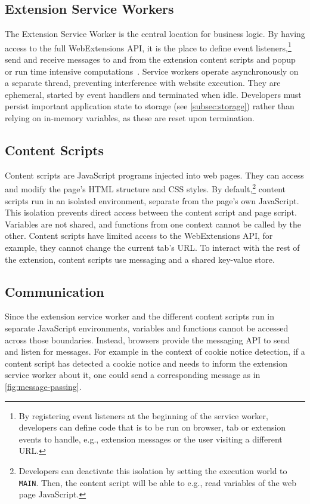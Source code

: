 \subsection{Extension Service Workers} \label{subsec:service-workers}
The Extension Service Worker is the central location for business logic.
By having access to the full WebExtensions API, it is the place to define event listeners,\footnote{
By registering event listeners at the beginning of the service worker, developers can define code that is to be run on browser, tab or extension events to handle, e.g., extension messages or the user visiting a different URL.}
send and receive messages to and from the extension content scripts and popup
or run time intensive computations~\cite[Ch. 4]{frisbie2023browser}.
Service workers operate asynchronously on a separate thread, preventing interference with website execution. 
They are ephemeral, started by event handlers and terminated when idle.
Developers must persist important application state to storage (see \cref{subsec:storage}) rather than relying on in-memory variables, as these are reset upon termination.

\subsection{Content Scripts} \label{subsec:content-scripts}
Content scripts are JavaScript programs injected into web pages. 
They can access and modify the page's HTML structure and CSS styles.
By default,\footnote{
Developers can deactivate this isolation by setting the execution world to \texttt{MAIN}. Then, the content script will be able to e.g., read variables of the web page JavaScript.
} content scripts run in an isolated environment, separate from the page's own JavaScript.
This isolation prevents direct access between the content script and page script.
Variables are not shared, and functions from one context cannot be called by the other.
Content scripts have limited access to the WebExtensions API, for example, they cannot change the current tab's URL.
To interact with the rest of the extension, content scripts use messaging and a shared key-value store.

\subsection{Communication}
Since the extension service worker and the different content scripts run in separate JavaScript environments, variables and functions cannot be accessed across those boundaries.
Instead, browsers provide the messaging API to send and listen for messages.
For example in the context of cookie notice detection, if a content script has detected a cookie notice and needs to inform the extension service worker about it, one could send a corresponding message as in \cref{fig:message-passing}.

